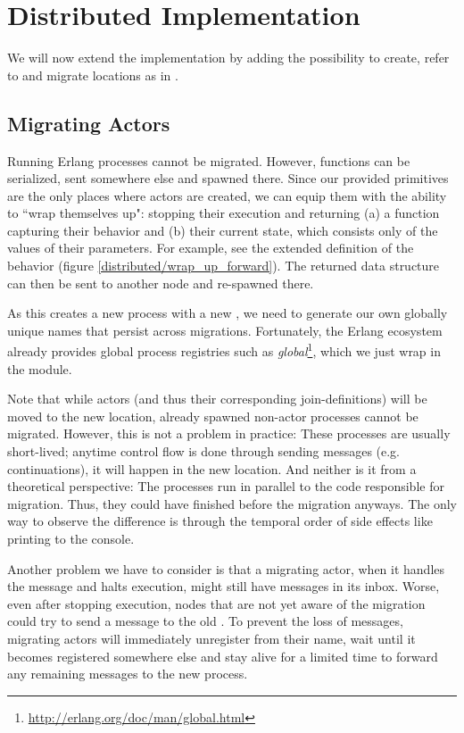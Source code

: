 \section{Distributed Implementation}

We will now extend the implementation by adding the possibility to
create, refer to and migrate locations as in \distjoincalc.


\subsection{Migrating Actors}
\label{ch_migration}

Running Erlang processes cannot be migrated.
However, functions can be serialized, sent somewhere else and spawned there.
Since our provided primitives are the only places where actors are created,
we can equip them with the ability to ``wrap themselves up":
stopping their execution and returning
(a) a function capturing their behavior and
(b) their current state, which consists only of the values of their parameters.
For example, see the extended definition of the  behavior
(figure \ref{distributed/wrap_up_forward}).
The returned data structure can then be sent to another node
and re-spawned there.


As this creates a new process with a new \PID,
we need to generate our own globally unique names
that persist across migrations.
Fortunately, the Erlang ecosystem already provides global process registries
such as \emph{global}\footnote{\url{http://erlang.org/doc/man/global.html}},
which we just wrap in the  module.

Note that while actors (and thus their corresponding join-definitions)
will be moved to the new location,
already spawned non-actor processes cannot be migrated.
However, this is not a problem in practice:
These processes are usually short-lived;
anytime control flow is done through sending messages (e.g. continuations),
it will happen in the new location.
And neither is it from a theoretical perspective:
The processes run in parallel to the code responsible for migration.
Thus, they could have finished before the migration anyways.
The only way to observe the difference is through the temporal order
of side effects like printing to the console.

Another problem we have to consider is that a migrating actor,
when it handles the  message and halts execution,
might still have messages in its inbox.
Worse, even after stopping execution,
nodes that are not yet aware of the migration
could try to send a message to the old \PID.
To prevent the loss of messages, migrating actors will immediately unregister
from their name, wait until it becomes registered somewhere else
and stay alive for a limited time to forward any remaining messages
to the new process.


